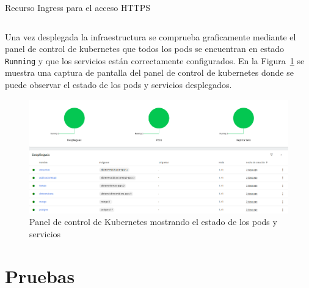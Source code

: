 \begin{longlisting}
\caption{Recurso Ingress para el acceso HTTPS}
\inputminted[firstline=390,lastline=411]{yaml}{../backend/despliegue/kubernetes/despliegue.yaml}
\label{lst:ingress}
\end{longlisting}

Una vez desplegada la infraestructura se comprueba graficamente mediante el panel de control de \gls{kubernetes} que todos los pods se encuentran en estado \texttt{Running} y que los servicios están correctamente configurados. En la Figura~\ref{fig:kubernetes-dashboard} se muestra una captura de pantalla del panel de control de \gls{kubernetes} donde se puede observar el estado de los pods y servicios desplegados.
\begin{figure}[h!tb]
    \centering
    \includegraphics[width=1\textwidth]{figs/kubernetes-dashboard.png}
    \caption{Panel de control de Kubernetes mostrando el estado de los pods y servicios}\label{fig:kubernetes-dashboard}
\end{figure}


\clearpage
\section{Pruebas}
